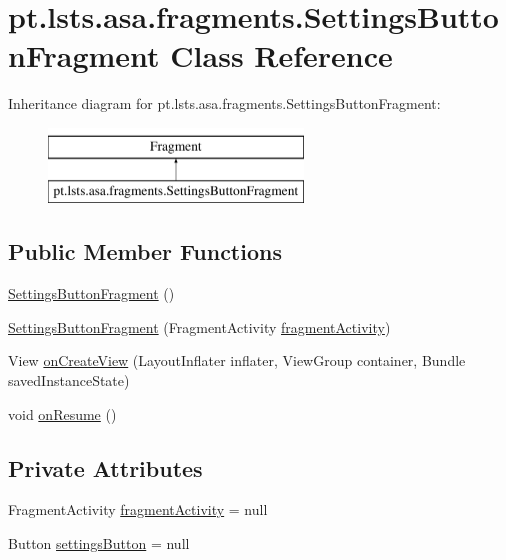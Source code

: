 \hypertarget{classpt_1_1lsts_1_1asa_1_1fragments_1_1SettingsButtonFragment}{}\section{pt.\+lsts.\+asa.\+fragments.\+Settings\+Button\+Fragment Class Reference}
\label{classpt_1_1lsts_1_1asa_1_1fragments_1_1SettingsButtonFragment}
Inheritance diagram for pt.\+lsts.\+asa.\+fragments.\+Settings\+Button\+Fragment\+:\begin{figure}[H]
\begin{center}
\leavevmode
\includegraphics[height=2.000000cm]{classpt_1_1lsts_1_1asa_1_1fragments_1_1SettingsButtonFragment}
\end{center}
\end{figure}
\subsection*{Public Member Functions}
\begin{DoxyCompactItemize}
\item 
\hyperlink{classpt_1_1lsts_1_1asa_1_1fragments_1_1SettingsButtonFragment_a5a6e3e6781bc9f1e9edf39a1e000b94e}{Settings\+Button\+Fragment} ()
\item 
\hyperlink{classpt_1_1lsts_1_1asa_1_1fragments_1_1SettingsButtonFragment_a375c79555f6414e94cf944440edc7d9f}{Settings\+Button\+Fragment} (Fragment\+Activity \hyperlink{classpt_1_1lsts_1_1asa_1_1fragments_1_1SettingsButtonFragment_aaeabd1b26ef6599c9b5a60f7baa4515e}{fragment\+Activity})
\item 
View \hyperlink{classpt_1_1lsts_1_1asa_1_1fragments_1_1SettingsButtonFragment_aedfbabe14521ebaebea10b95994519af}{on\+Create\+View} (Layout\+Inflater inflater, View\+Group container, Bundle saved\+Instance\+State)
\item 
void \hyperlink{classpt_1_1lsts_1_1asa_1_1fragments_1_1SettingsButtonFragment_a1af897ac87b2efa9374ec7eb71ddf533}{on\+Resume} ()
\end{DoxyCompactItemize}
\subsection*{Private Attributes}
\begin{DoxyCompactItemize}
\item 
Fragment\+Activity \hyperlink{classpt_1_1lsts_1_1asa_1_1fragments_1_1SettingsButtonFragment_aaeabd1b26ef6599c9b5a60f7baa4515e}{fragment\+Activity} = null
\item 
Button \hyperlink{classpt_1_1lsts_1_1asa_1_1fragments_1_1SettingsButtonFragment_a664eb62fa210bdf78ef91838efda3ce1}{settings\+Button} = null
\end{DoxyCompactItemize}


